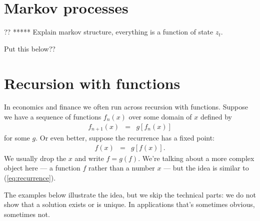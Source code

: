 \documentclass[11pt]{article}
\begin{document}
\section{Markov processes}

??
***** Explain markov structure, everything is a function of state $z_t$.

Put this below??



\section{Recursion with functions}

In economics and finance we often run across recursion with functions.
Suppose we have a sequence of functions $f_n(x)$ over some
domain of $x$ defined by
\begin{eqnarray*}
    f_{n+1}(x) &=& g[f_n(x)]
\end{eqnarray*}
for some $g$.
Or even better, suppose the recurrence has a fixed point:
\begin{eqnarray*}
    f(x) &=& g[f(x)] .
\end{eqnarray*}
We usually drop the $x$ and write $f = g(f) $.
We're talking about a more complex object here --- a function $f$ rather than a number $x$ ---
but the idea is similar to (\ref{eq:recurrence}).

The examples below illustrate the idea, but we skip the technical parts:
we do not show that a solution exists or is unique.
In applications that's sometimes obvious, sometimes not.

\begin{comment}
{\bf Discounting cash flows.\/}
It's not usually presented this way,
but we can approach equity valuation as either a discounted present value or a sequence.
Let's start with the former
and think of equity as a claim to the dividend stream $d_1, d_2, \ldots $.
The value now of an equity claim might be written
\begin{eqnarray*}
    v &=& \sum_{j=1}^\infty \delta^j d_{j} ,
\end{eqnarray*}
where $\delta$ is a number between zero and one.
In a finance course, they'd typically write $\delta = 1/(1+r)$, but this is more compact.

Here's a recursive version where we add one dividend at a time.
Consider the sequence
\begin{eqnarray*}
    v^{n+1} &=& \delta [d_{n+1} + v^n] ,
\end{eqnarray*}
starting with $v^0 = 0$.
Then
The value of the first two dividends is the value of
\end{comment}
\end{document}
